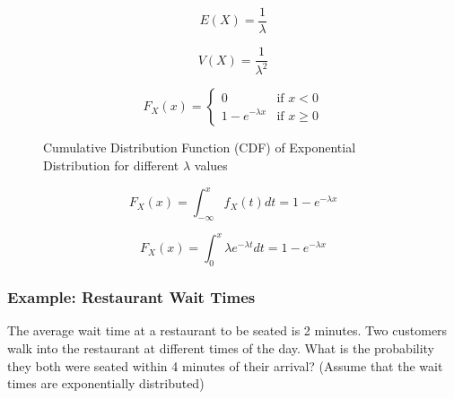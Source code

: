 \documentclass{article}
\begin{document}
    \[
    E(X) = \frac{1}{\lambda}
    \]

    \[
    V(X) = \frac{1}{\lambda^2}
    \]

    \[
    F_X(x) = \begin{cases} 
        0 & \text{if } x < 0 \\
        1 - e^{-\lambda x} & \text{if } x \geq 0
    \end{cases}
    \]

    \begin{figure}[h]
        \centering
        \caption{Cumulative Distribution Function (CDF) of Exponential Distribution for different $\lambda$ values}
    \end{figure}

    \[
    F_X(x) = \int_{-\infty}^{x} f_X(t) dt = 1 - e^{-\lambda x}
    \]

    \[
    F_X(x) = \int_{0}^{x} \lambda e^{-\lambda t} dt = 1 - e^{-\lambda x}
    \]

    \subsubsection*{Example: Restaurant Wait Times}

    The average wait time at a restaurant to be seated is 2 minutes. Two customers walk into the restaurant at different times of the day. What is the probability they both were seated within 4 minutes of their arrival? (Assume that the wait times are exponentially distributed)
\end{document}
